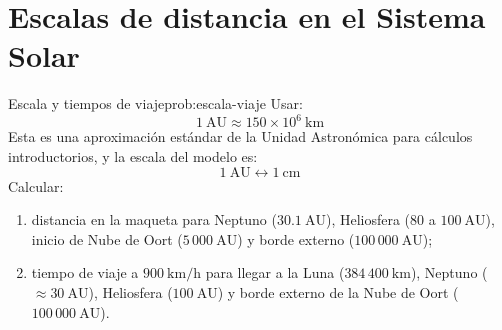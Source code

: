 \documentclass[12pt,oneside]{book}
\begin{document}
\section{Escalas de distancia en el Sistema Solar}

\begin{problema}{Escala y tiempos de viaje}{prob:escala-viaje}
Usar:
\[
1\ \mathrm{AU}\approx 150\times 10^6\ \mathrm{km}
\]
Esta es una aproximación estándar de la Unidad Astronómica para cálculos introductorios,
y la escala del modelo es:
\[
1\ \mathrm{AU}\longleftrightarrow 1\ \mathrm{cm}
\]
Calcular:
\begin{enumerate}[leftmargin=1.5em, label=\alph*)]
  \item distancia en la maqueta para Neptuno (\(30.1\ \mathrm{AU}\)),
        Heliosfera (\(80\) a \(100\ \mathrm{AU}\)),
        inicio de Nube de Oort (\(5\,000\ \mathrm{AU}\))
        y borde externo (\(100\,000\ \mathrm{AU}\));
  \item tiempo de viaje a \(900\ \mathrm{km/h}\) para llegar a
        la Luna (\(384\,400\ \mathrm{km}\)),
        Neptuno (\(\approx 30\ \mathrm{AU}\)),
        Heliosfera (\(100\ \mathrm{AU}\))
        y borde externo de la Nube de Oort (\(100\,000\ \mathrm{AU}\)).
\end{enumerate}
\end{problema}
\end{document}
